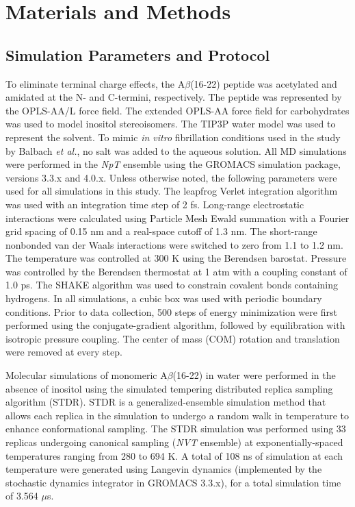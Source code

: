 \section{Materials and Methods}

\subsection{Simulation Parameters and Protocol}

To eliminate terminal charge effects, the A$\beta$(16-22) peptide was acetylated and amidated at the N- and C-termini, respectively. The peptide was represented by the OPLS-AA/L force field.\cite{Jorgensen:1996p19} The extended OPLS-AA force field for carbohydrates\cite{Damm:1997p36} was used to model inositol stereoisomers. The TIP3P water model\cite{Jorgensen:1983p40} was used to represent the solvent. To mimic \emph{in vitro} fibrillation conditions used in the study by Balbach \emph{et al.}\cite{Balbach:2000p49}, no salt was added to the aqueous solution.  All MD simulations were performed in the \emph{NpT} ensemble using the GROMACS simulation package,\cite{Hess:2008p264,VanDerSpoel:2005p56} versions 3.3.x and 4.0.x. Unless otherwise noted, the following parameters were used for all simulations in this study. The leapfrog Verlet integration algorithm was used with an integration time step of 2 fs. Long-range electrostatic interactions were calculated using Particle Mesh Ewald summation with a Fourier grid spacing of 0.15 nm and a real-space cutoff of 1.3 nm.\cite{Darden:1993p266} The short-range nonbonded van der Waals interactions were switched to zero from 1.1 to 1.2 nm. The temperature was controlled at 300 K using the Berendsen barostat.\cite{Berendsen:1984p26} Pressure was controlled by the Berendsen thermostat at 1 atm with a coupling constant of 1.0 ps.\cite{Berendsen:1984p26} The SHAKE algorithm was used to constrain covalent bonds containing hydrogens.\cite{Ryckaert:1977p30} In all simulations, a cubic box was used with periodic boundary conditions. Prior to data collection, 500 steps of energy minimization were first performed using the conjugate-gradient algorithm, followed by equilibration with isotropic pressure coupling. The center of mass (COM) rotation and translation were removed at every step. 

Molecular simulations of monomeric A$\beta$(16-22) in water were performed in the absence of inositol using the simulated tempering distributed replica sampling algorithm (STDR).\cite{Rauscher:2009p166} STDR is a generalized-ensemble simulation method that allows each replica in the simulation to undergo a random walk in temperature to enhance conformational sampling.\cite{Rauscher:2009p166,Rodinger:2006p78} The STDR simulation was performed using 33 replicas undergoing canonical sampling (\emph{NVT} ensemble) at exponentially-spaced temperatures ranging from 280 to 694 K. A total of 108 ns of simulation at each temperature were generated using Langevin dynamics (implemented by the stochastic dynamics integrator in GROMACS 3.3.x), for a total simulation time of 3.564 $\mu$s. 

